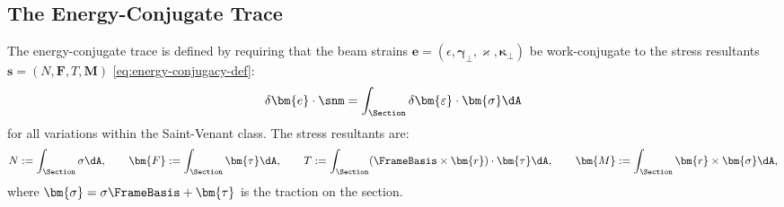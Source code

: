 \subsection{The Energy-Conjugate Trace}
\label{sec:trace-energy}

The energy-conjugate trace is defined by requiring that the beam strains 
$\bm{e} = (\epsilon, \bm{\gamma}_\perp, \varkappa, \bm{\kappa}_\perp)$ 
be work-conjugate to the stress resultants 
$\bm{s} = (N, \bm{F}, T, \bm{M})$ \eqref{eq:energy-conjugacy-def}:
\begin{equation*}
\delta\bm{e} \cdot \snm = \int_\Section \delta\bm{\varepsilon} \cdot \bm{\sigma} \dA
\end{equation*}
for all variations within the Saint-Venant class. 
The stress resultants are:
\begin{equation*}
N := \int_\Section \sigma \dA, \qquad 
\bm{F} := \int_\Section \bm{\tau} \dA, \qquad 
T := \int_\Section (\FrameBasis \times \bm{r}) \cdot \bm{\tau} \dA, \qquad 
\bm{M} := \int_\Section \bm{r} \times \bm{\sigma} \dA,
\end{equation*}
where $\bm{\sigma} = \sigma\FrameBasis + \bm{\tau}$ is the traction on the section.

